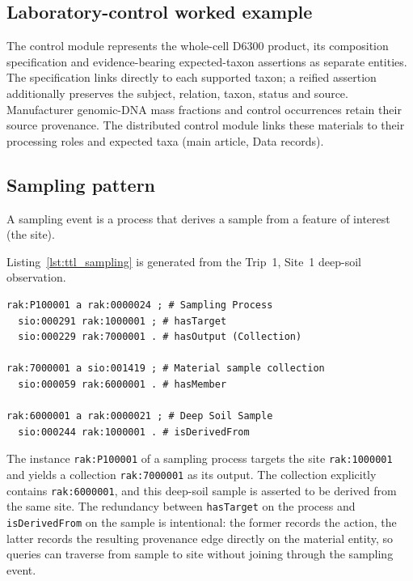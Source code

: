 \subsection{Laboratory-control worked example}

The control module represents the whole-cell D6300 product, its
composition specification and evidence-bearing expected-taxon
assertions as separate entities. The specification links directly to
each supported taxon; a reified assertion additionally preserves the
subject, relation, taxon, status and source. Manufacturer genomic-DNA
mass fractions and control occurrences retain their source provenance.
The distributed control module links these materials to their processing
roles and expected taxa (main article, Data records).

\subsection{Sampling pattern}

A sampling event is a process that derives a sample from a feature of
interest (the site).



Listing~\ref{lst:ttl_sampling} is generated from the Trip~1, Site~1
deep-soil observation.

\begin{lstlisting}[caption={Turtle representation of a sampling process.}, label={lst:ttl_sampling}, basicstyle=\ttfamily\scriptsize, frame=single]
rak:P100001 a rak:0000024 ; # Sampling Process
  sio:000291 rak:1000001 ; # hasTarget
  sio:000229 rak:7000001 . # hasOutput (Collection)

rak:7000001 a sio:001419 ; # Material sample collection
  sio:000059 rak:6000001 . # hasMember

rak:6000001 a rak:0000021 ; # Deep Soil Sample
  sio:000244 rak:1000001 . # isDerivedFrom
\end{lstlisting}

The instance \texttt{rak:P100001} of a sampling
process targets the site \texttt{rak:1000001} and yields a
collection \texttt{rak:7000001} as its output. The collection
explicitly contains \texttt{rak:6000001}, and this deep-soil sample
is asserted to be derived
from the same site. The redundancy between \texttt{hasTarget} on the
process and \texttt{isDerivedFrom} on the sample is intentional: the
former records the action, the latter records the resulting
provenance edge directly on the material entity, so queries can
traverse from sample to site without joining through the sampling
event.

